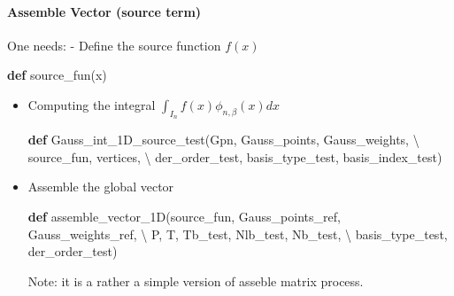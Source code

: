 \documentclass[11pt]{article}
\newenvironment{Shaded}{}{}
\newcommand{\KeywordTok}[1]{\textcolor[rgb]{0.00,0.44,0.13}{\textbf{{#1}}}}
\newcommand{\NormalTok}[1]{{#1}}
\newcommand{\OperatorTok}[1]{\textcolor[rgb]{0.40,0.40,0.40}{{#1}}}
\begin{document}
    \paragraph{Assemble Vector (source
term)}\label{assemble-vector-source-term}

One needs: - Define the source function \(f(x)\)

\begin{Shaded}
\begin{Highlighting}[]
\KeywordTok{def}\NormalTok{ source_fun(x)}
\end{Highlighting}
\end{Shaded}

\begin{itemize}
\item
  Computing the integral \(\int_{I_n} f(x){\phi_{n,\beta}}(x)dx\)

\begin{Shaded}
\begin{Highlighting}[]
\KeywordTok{def}\NormalTok{ Gauss_int_1D_source_test(Gpn, Gauss_points, Gauss_weights, }\OperatorTok{\textbackslash{}}
\NormalTok{                 source_fun, vertices, }\OperatorTok{\textbackslash{}}
\NormalTok{                 der_order_test,  basis_type_test,  basis_index_test)}
\end{Highlighting}
\end{Shaded}
\item
  Assemble the global vector

\begin{Shaded}
\begin{Highlighting}[]
\KeywordTok{def}\NormalTok{ assemble_vector_1D(source_fun, Gauss_points_ref, Gauss_weights_ref, }\OperatorTok{\textbackslash{}}
\NormalTok{                   P, T, Tb_test, Nlb_test, Nb_test, }\OperatorTok{\textbackslash{}}
\NormalTok{                   basis_type_test, der_order_test)}
\end{Highlighting}
\end{Shaded}

  Note: it is a rather a simple version of asseble matrix process.
\end{itemize}
\end{document}
